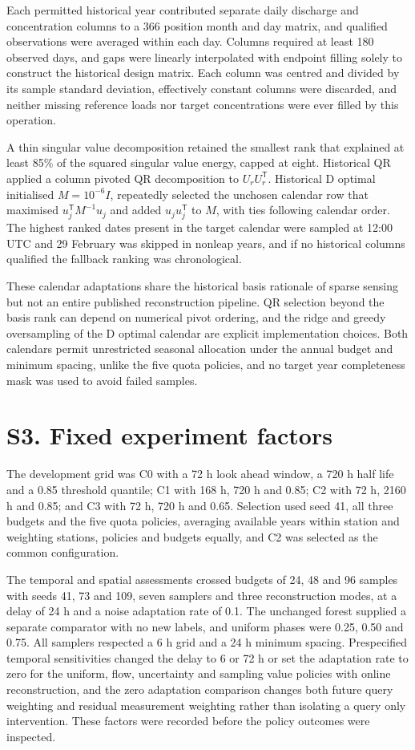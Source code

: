 \documentclass[lineno,pdflatex,sn-apa]{sn-jnl}%
\theoremstyle{thmstyleone}%
\theoremstyle{thmstyletwo}%
\theoremstyle{thmstylethree}%
\begin{document}
Each permitted historical year contributed separate daily discharge and concentration columns to a 366 position month and day matrix, and qualified observations were averaged within each day. Columns required at least 180 observed days, and gaps were linearly interpolated with endpoint filling solely to construct the historical design matrix. Each column was centred and divided by its sample standard deviation, effectively constant columns were discarded, and neither missing reference loads nor target concentrations were ever filled by this operation.

A thin singular value decomposition retained the smallest rank that explained at least 85\% of the squared singular value energy, capped at eight. Historical QR applied a column pivoted QR decomposition to $U_rU_r^\mathsf T$. Historical D optimal initialised $M=10^{-6}I$, repeatedly selected the unchosen calendar row that maximised $u_j^\mathsf TM^{-1}u_j$ and added $u_ju_j^\mathsf T$ to $M$, with ties following calendar order. The highest ranked dates present in the target calendar were sampled at 12:00 UTC and 29 February was skipped in nonleap years, and if no historical columns qualified the fallback ranking was chronological.

These calendar adaptations share the historical basis rationale of sparse sensing but not an entire published reconstruction pipeline. QR selection beyond the basis rank can depend on numerical pivot ordering, and the ridge and greedy oversampling of the D optimal calendar are explicit implementation choices. Both calendars permit unrestricted seasonal allocation under the annual budget and minimum spacing, unlike the five quota policies, and no target year completeness mask was used to avoid failed samples.

\section*{S3. Fixed experiment factors}

The development grid was C0 with a 72 h look ahead window, a 720 h half life and a 0.85 threshold quantile; C1 with 168 h, 720 h and 0.85; C2 with 72 h, 2160 h and 0.85; and C3 with 72 h, 720 h and 0.65. Selection used seed 41, all three budgets and the five quota policies, averaging available years within station and weighting stations, policies and budgets equally, and C2 was selected as the common configuration.

The temporal and spatial assessments crossed budgets of 24, 48 and 96 samples with seeds 41, 73 and 109, seven samplers and three reconstruction modes, at a delay of 24 h and a noise adaptation rate of 0.1. The unchanged forest supplied a separate comparator with no new labels, and uniform phases were 0.25, 0.50 and 0.75. All samplers respected a 6 h grid and a 24 h minimum spacing. Prespecified temporal sensitivities changed the delay to 6 or 72 h or set the adaptation rate to zero for the uniform, flow, uncertainty and sampling value policies with online reconstruction, and the zero adaptation comparison changes both future query weighting and residual measurement weighting rather than isolating a query only intervention. These factors were recorded before the policy outcomes were inspected.
\end{document}
